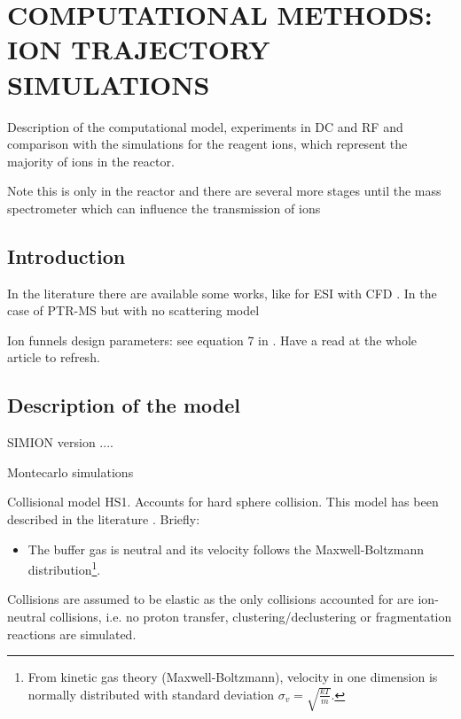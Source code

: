 \chapter{COMPUTATIONAL METHODS: ION TRAJECTORY SIMULATIONS}

Description of the computational model, experiments in DC and RF and comparison with the simulations for the reagent ions, which represent the majority of ions in the reactor.

Note this is only in the reactor and there are several more stages until the mass spectrometer which can influence the transmission of ions


\section{Introduction}

In the literature there are available some works, like for ESI with CFD \cite{doi:10.1002/jms.3519}. In the case of PTR-MS but with no scattering model \cite{ENNIS200572}

Ion funnels design parameters: see equation 7 in \cite{doi:10.1021/ac990346w}. Have a read at the whole article to refresh.


\section{Description of the model}









SIMION version ....

Montecarlo simulations

Collisional model HS1. Accounts for hard sphere collision. This model has been described in the literature \cite{appelhans2002measurement,DAHL20003,manura2008simion}. Briefly:
\begin{itemize}
\item The buffer gas is  neutral and its velocity follows the Maxwell-Boltzmann distribution\footnote[2]{From kinetic gas theory (Maxwell-Boltzmann), velocity in one dimension is normally distributed with standard deviation $\sigma_v = \sqrt{\frac{kT}{m}}$.}.
\end{itemize}


Collisions are assumed to be elastic as the only collisions accounted for are ion-neutral collisions, i.e. no proton transfer, clustering/declustering or fragmentation reactions are simulated.


